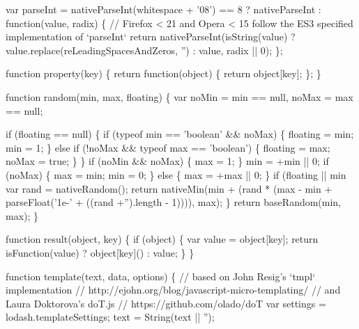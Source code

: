 \begin{DoxyCodeInclude}
    var parseInt = nativeParseInt(whitespace + \textcolor{stringliteral}{'08'}) == 8 ? nativeParseInt : \textcolor{keyword}{function}(value, radix) \{
      \textcolor{comment}{// Firefox < 21 and Opera < 15 follow the ES3 specified implementation of `parseInt`}
      \textcolor{keywordflow}{return} nativeParseInt(isString(value) ? value.replace(reLeadingSpacesAndZeros, \textcolor{stringliteral}{''}) : value, radix || 
      0);
    \};

    \textcolor{keyword}{function} property(key) \{
      \textcolor{keywordflow}{return} \textcolor{keyword}{function}(object) \{
        \textcolor{keywordflow}{return} \textcolor{keywordtype}{object}[key];
      \};
    \}

    \textcolor{keyword}{function} random(min, max, floating) \{
      var noMin = min == null,
          noMax = max == null;

      \textcolor{keywordflow}{if} (floating == null) \{
        \textcolor{keywordflow}{if} (typeof min == \textcolor{stringliteral}{'boolean'} && noMax) \{
          floating = min;
          min = 1;
        \}
        \textcolor{keywordflow}{else} \textcolor{keywordflow}{if} (!noMax && typeof max == \textcolor{stringliteral}{'boolean'}) \{
          floating = max;
          noMax = \textcolor{keyword}{true};
        \}
      \}
      \textcolor{keywordflow}{if} (noMin && noMax) \{
        max = 1;
      \}
      min = +min || 0;
      \textcolor{keywordflow}{if} (noMax) \{
        max = min;
        min = 0;
      \} \textcolor{keywordflow}{else} \{
        max = +max || 0;
      \}
      \textcolor{keywordflow}{if} (floating || min %
        var rand = nativeRandom();
        \textcolor{keywordflow}{return} nativeMin(min + (rand * (max - min + parseFloat(\textcolor{stringliteral}{'1e-'} + ((rand +\textcolor{stringliteral}{''}).length - 1)))), max);
      \}
      \textcolor{keywordflow}{return} baseRandom(min, max);
    \}

    \textcolor{keyword}{function} result(\textcolor{keywordtype}{object}, key) \{
      \textcolor{keywordflow}{if} (\textcolor{keywordtype}{object}) \{
        var value = \textcolor{keywordtype}{object}[key];
        \textcolor{keywordflow}{return} isFunction(value) ? \textcolor{keywordtype}{object}[key]() : value;
      \}
    \}

    \textcolor{keyword}{function} \textcolor{keyword}{template}(text, data, options) \{
      \textcolor{comment}{// based on John Resig's `tmpl` implementation}
      \textcolor{comment}{// http://ejohn.org/blog/javascript-micro-templating/}
      \textcolor{comment}{// and Laura Doktorova's doT.js}
      \textcolor{comment}{// https://github.com/olado/doT}
      var settings = lodash.templateSettings;
      text = String(text || \textcolor{stringliteral}{''});


\end{DoxyCodeInclude}
